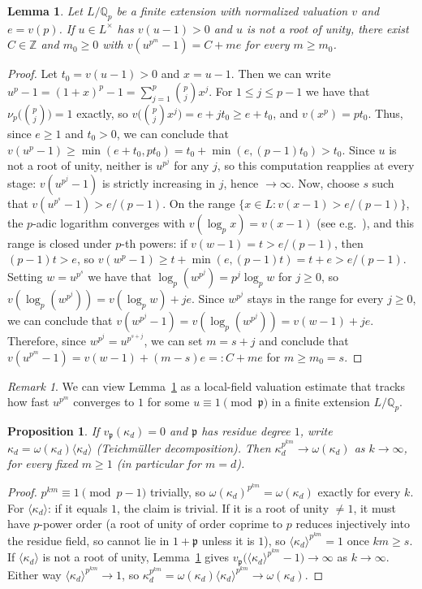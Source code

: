 \documentclass{article}
\theoremstyle{plain}
\newtheorem{lemma}[theorem]{Lemma}
\newtheorem{proposition}[theorem]{Proposition}
\theoremstyle{definition}
\theoremstyle{remark}
\newtheorem{remark}[theorem]{Remark}
\newcommand{\Z}{\mathbb{Z}}
\newcommand{\Qp}{\mathbb{Q}_p}
\begin{document}
\begin{lemma}\label{lem:local}
Let $L/\Qp$ be a finite extension with normalized valuation $v$ and $e=v(p)$. If $u\in L^\times$ has $v(u-1)>0$ and $u$ is not a root of unity, there exist $C\in\Z$ and $m_0\ge0$ with $v(u^{p^m}-1)=C+me$ for every $m\ge m_0$.
\end{lemma}
\begin{proof}
 Let $t_0=v(u-1)>0$ and $x=u-1$. Then we can write  $u^p-1=(1+x)^p-1=\sum_{j=1}^p\binom pjx^j$. For $1\le j\le p-1$ we have that  $\nu_p\big(\binom pj\big)=1$ exactly, so $v\big(\binom pjx^j\big)=e+jt_0\ge e+t_0$, and $v(x^p)=pt_0$. Thus, since $e\ge1$ and $t_0>0$, we can conclude that  $v(u^p-1)\ge\min(e+t_0,pt_0)=t_0+\min(e,(p-1)t_0)>t_0$. Since $u$ is not a root of unity, neither is $u^{p^j}$ for any $j$, so this computation reapplies at every stage: $v(u^{p^j}-1)$ is strictly increasing in $j$, hence $\to\infty$. Now, choose $s$ such that $v(u^{p^s}-1)>e/(p-1)$. On the range $\{x\in L:v(x-1)>e/(p-1)\}$, the $p$-adic logarithm converges with $v(\log_p x)=v(x-1)$ (see e.g.\ \cite{Serre,Neukirch}), and this range is closed under $p$-th powers: if $v(w-1)=t>e/(p-1)$, then $(p-1)t>e$, so $v(w^p-1)\ge t+\min(e,(p-1)t)=t+e>e/(p-1)$. Setting $w=u^{p^s}$ we have that $\log_p(w^{p^j})=p^j\log_p w$ for $j\ge0$, so $v(\log_p(w^{p^j}))=v(\log_p w)+je$. Since $w^{p^j}$ stays in the range for every $j\ge0$, we can conclude that $v(w^{p^j}-1)=v(\log_p(w^{p^j}))=v(w-1)+je$. Therefore, since $w^{p^j}=u^{p^{s+j}}$, we can set $m=s+j$ and conclude that $v(u^{p^m}-1)=v(w-1)+(m-s)e=:C+me$ for $m\ge m_0=s$.
\end{proof}

\begin{remark}
    We can view Lemma~\ref{lem:local} as a local-field valuation estimate that tracks how fast $u^{p^m}$ converges to $1$ for some $u\equiv1\pmod{\mathfrak p}$ in a finite extension $L/\Qp$.
\end{remark}

\begin{proposition}\label{prop:teich}
If $v_\mathfrak p(\kappa_d)=0$ and $\mathfrak p$ has residue degree $1$, write $\kappa_d=\omega(\kappa_d)\langle\kappa_d\rangle$ (Teichm\"uller decomposition). Then $\kappa_d^{p^{km}}\to\omega(\kappa_d)$ as $k\to\infty$, for every fixed $m\ge1$ (in particular for $m=d$).
\end{proposition}
\begin{proof}
$p^{km}\equiv1\pmod{p-1}$ trivially, so $\omega(\kappa_d)^{p^{km}}=\omega(\kappa_d)$ exactly for every $k$. For $\langle\kappa_d\rangle$: if it equals $1$, the claim is trivial. If it is a root of unity $\ne1$, it must have $p$-power order (a root of unity of order coprime to $p$ reduces injectively into the residue field, so cannot lie in $1+\mathfrak p$ unless it is $1$), so $\langle\kappa_d\rangle^{p^{km}}=1$ once $km \geq s$. If $\langle\kappa_d\rangle$ is not a root of unity, Lemma~\ref{lem:local} gives $v_\mathfrak p\big(\langle\kappa_d\rangle^{p^{km}}-1\big)\to\infty$ as $k\to\infty$. Either way $\langle\kappa_d\rangle^{p^{km}}\to1$, so $\kappa_d^{p^{km}}=\omega(\kappa_d)\langle\kappa_d\rangle^{p^{km}}\to\omega(\kappa_d)$.
\end{proof}
\end{document}
